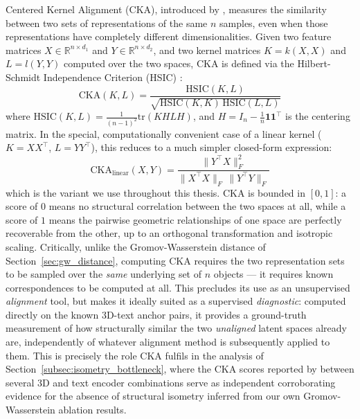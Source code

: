 Centered Kernel Alignment (CKA), introduced by \textcite{kornblith2019similarity}, measures the similarity between two sets of representations of the same $n$ samples, even when those representations have completely different dimensionalities. Given two feature matrices $X \in \mathbb{R}^{n \times d_1}$ and $Y \in \mathbb{R}^{n \times d_2}$, and two kernel matrices $K = k(X,X)$ and $L = l(Y,Y)$ computed over the two spaces, CKA is defined via the Hilbert-Schmidt Independence Criterion (HSIC) \cite{gretton2005measuring}:
\begin{equation}
    \mathrm{CKA}(K, L) = \frac{\mathrm{HSIC}(K, L)}{\sqrt{\mathrm{HSIC}(K, K) \, \mathrm{HSIC}(L, L)}}
    \label{eq:cka}
\end{equation}
where $\mathrm{HSIC}(K, L) = \frac{1}{(n-1)^2} \mathrm{tr}(K H L H)$, and $H = I_n - \frac{1}{n}\mathbf{1}\mathbf{1}^\top$ is the centering matrix. In the special, computationally convenient case of a linear kernel ($K = XX^\top$, $L = YY^\top$), this reduces to a much simpler closed-form expression:
\begin{equation}
    \mathrm{CKA}_{\mathrm{linear}}(X, Y) = \frac{\| Y^\top X \|_F^2}{\| X^\top X \|_F \, \| Y^\top Y \|_F}
    \label{eq:linear_cka}
\end{equation}
which is the variant we use throughout this thesis. CKA is bounded in $[0, 1]$: a score of $0$ means no structural correlation between the two spaces at all, while a score of $1$ means the pairwise geometric relationships of one space are perfectly recoverable from the other, up to an orthogonal transformation and isotropic scaling. Critically, unlike the Gromov-Wasserstein distance of Section~\ref{sec:gw_distance}, computing CKA requires the two representation sets to be sampled over the \emph{same} underlying set of $n$ objects --- it requires known correspondences to be computed at all. This precludes its use as an unsupervised \emph{alignment} tool, but makes it ideally suited as a supervised \emph{diagnostic}: computed directly on the known 3D-text anchor pairs, it provides a ground-truth measurement of how structurally similar the two \emph{unaligned} latent spaces already are, independently of whatever alignment method is subsequently applied to them. This is precisely the role CKA fulfils in the analysis of Section~\ref{subsec:isometry_bottleneck}, where the CKA scores reported by \textcite{hadgi2025escaping} between several 3D and text encoder combinations serve as independent corroborating evidence for the absence of structural isometry inferred from our own Gromov-Wasserstein ablation results.

